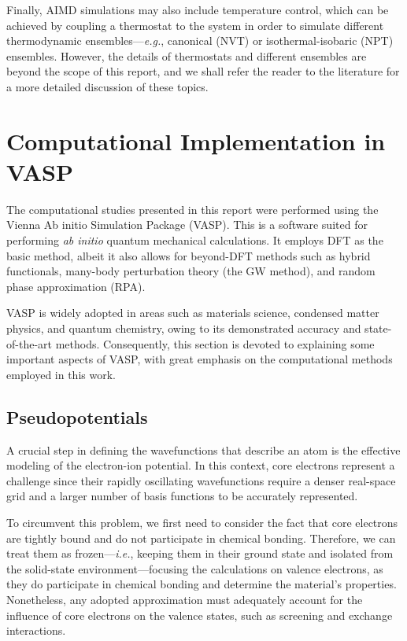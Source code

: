 Finally, AIMD simulations may also include temperature control, which can be achieved by coupling a thermostat to the system in order to simulate different thermodynamic ensembles---\emph{e.g.}, canonical (NVT) or isothermal-isobaric (NPT) ensembles.
However, the details of thermostats and different ensembles are beyond the scope of this report, and we shall refer the reader to the literature\supercite{tuckerman2023statistical,frenkel2023understanding} for a more detailed discussion of these topics.

\section{Computational Implementation in VASP}
The computational studies presented in this report were performed using the Vienna Ab initio Simulation Package (VASP). This is a software suited for performing \emph{ab initio} quantum mechanical calculations\supercite{https://doi.org/10.1002/jcc.21057}. It employs DFT as the basic method, albeit it also allows for beyond-DFT methods such as hybrid functionals, many-body perturbation theory (the GW method), and random phase approximation (RPA). 

VASP is widely adopted in areas such as materials science, condensed matter physics, and quantum chemistry, owing to its demonstrated accuracy and state-of-the-art methods. Consequently, this section is devoted to explaining some important aspects of VASP, with great emphasis on the computational methods employed in this work. 

\subsection{Pseudopotentials}
A crucial step in defining the wavefunctions that describe an atom is the effective modeling of the electron-ion potential. In this context, core electrons represent a challenge since their rapidly oscillating wavefunctions require a denser real-space grid and a larger number of basis functions to be accurately represented.

To circumvent this problem, we first need to consider the fact that core electrons are tightly bound and do not participate in chemical bonding. Therefore, we can treat them as frozen---\emph{i.e.}, keeping them in their ground state and isolated from the solid-state environment---focusing the calculations on valence electrons, as they do participate in chemical bonding and determine the material's properties. Nonetheless, any adopted approximation must adequately account for the influence of core electrons on the valence states, such as screening and exchange interactions.


